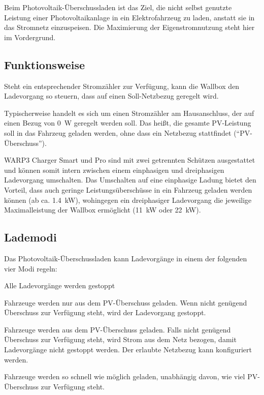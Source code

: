 \documentclass[a4paper,10pt]{article}
\begin{document}
\begin{multicols*}{2}
	Beim Photovoltaik-Überschussladen ist das Ziel, die nicht selbst genutzte Leistung einer
	Photovoltaikanlage in ein
	Elektrofahrzeug zu laden, anstatt sie in das Stromnetz einzuspeisen. Die Maximierung der Eigenstromnutzung steht hier
	im Vordergrund.

	\subsection{Funktionsweise}
	Steht ein entsprechender Stromzähler zur Verfügung, kann die Wallbox den
	Ladevorgang so steuern, dass auf einen Soll-Netzbezug geregelt wird.

	Typischerweise handelt es sich um einen Stromzähler am Hausanschluss, der auf
	einen Bezug von \SI{0}{\watt} geregelt werden soll. Das heißt, die gesamte
	PV-Leistung soll in das Fahrzeug geladen werden, ohne dass ein Netzbezug
	stattfindet (\enquote{PV-Überschuss}).

	WARP3 Charger Smart und Pro sind mit zwei getrennten Schützen
	ausgestattet und können somit intern zwischen einem einphasigen und dreiphasigen
	Ladevorgang umschalten. Das Umschalten auf eine einphasige Ladung bietet den Vorteil, dass auch geringe
	Leistungsüberschüsse in ein Fahrzeug geladen werden können (ab ca.
	\SI{1,4}{\kilo\watt}), wohingegen ein dreiphasiger Ladevorgang die jeweilige
	Maximalleistung der Wallbox ermöglicht (\SI{11}{\kilo\watt} oder
	\SI{22}{\kilo\watt}).

	\subsection{Lademodi}

	Das Photovoltaik-Überschussladen kann Ladevorgänge in einem der folgenden vier Modi regeln:

	\begin{description}[labelindent=0.5cm, leftmargin=0.5cm]
	 \item[Aus] Alle Ladevorgänge werden gestoppt
	 \item[PV] Fahrzeuge werden nur aus dem PV-Überschuss geladen.
               Wenn nicht genügend Überschuss zur Verfügung steht, wird der Ladevorgang gestoppt.
	 \item[Min+PV] Fahrzeuge werden aus dem PV-Überschuss geladen.
                   Falls nicht genügend Überschuss zur Verfügung steht, wird Strom aus dem Netz bezogen,
                   damit Ladevorgänge nicht gestoppt werden.
                   Der erlaubte Netzbezug kann konfiguriert werden.
     \item[Schnell] Fahrzeuge werden so schnell wie möglich geladen, unabhängig davon, wie viel PV-Überschuss zur Verfügung steht.
	\end{description}



\end{multicols*}
\end{document}
